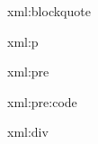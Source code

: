 %
%

\startxmlsetups xml:blockquote
  \startblockquote
  \stopblockquote
\stopxmlsetups

\startxmlsetups xml:p
   {
    \ignorespaces
    \removeunwantedspaces
  }
  \par
\stopxmlsetups


\startxmlsetups xml:pre
  \startxmldisplayverbatim
  \stopxmldisplayverbatim
\stopxmlsetups

\startxmlsetups xml:pre:code
  \startxmldisplayverbatim
  \stopxmldisplayverbatim
\stopxmlsetups

\startxmlsetups xml:div
  \stop
\stopxmlsetups

